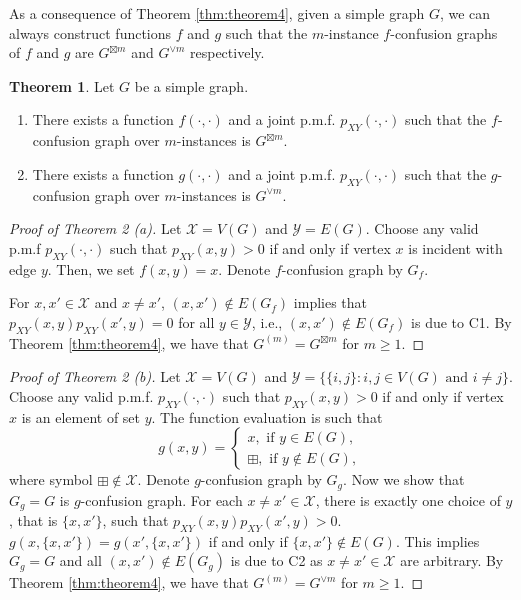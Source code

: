 \documentclass[journal, onecolumn, draftcls]{IEEEtran}
\theoremstyle{definition}
\newtheorem{theorem}{Theorem}
\newcommand{\calX}{\mathcal{X}}
\newcommand{\calY}{\mathcal{Y}}
\begin{document}
As a consequence of Theorem \ref{thm:theorem4}, given a simple graph $G$, we can always construct functions $f$ and $g$ such that the $m$-instance $f$-confusion graphs of $f$ and $g$ are  $G^{\boxtimes m}$ and $G^{\lor m}$ respectively. 
\begin{theorem}\label{thm:construct_function_based_on_G}
Let $G$ be a simple graph. 
\begin{enumerate}[label=(\alph*)]
\item There exists a function $f(\cdot,\cdot)$ and a joint p.m.f. $p_{XY}(\cdot,\cdot)$ such that  the   $f$-confusion graph over $m$-instances is $G^{\boxtimes m}$.
\item There exists a function $g(\cdot,\cdot)$ and a joint p.m.f. $p_{XY}(\cdot,\cdot)$ such that  the $g$-confusion graph over $m$-instances  is $G^{\lor m}$.
\end{enumerate}
\end{theorem}
\begin{proof}[Proof of Theorem 2 (a)]
Let $\calX = V(G)$ and $\calY = E(G)$. Choose any valid p.m.f $p_{XY}(\cdot,\cdot)$ such that  $p_{XY}(x,y)>0$ if and only if vertex $x$ is incident with edge $y$.  Then, we set $f(x,y) = x$. Denote $f$-confusion graph by $G_f$.


For $x, x' \in \calX$ and $x \neq x'$, $(x,x')\notin E(G_f)$ implies that $p_{XY}(x,y)p_{XY}(x',y)=0$ for all $y \in \calY$, i.e., $(x,x')\notin E(G_f)$ is due to C1.
By Theorem \ref{thm:theorem4}, we have that $G^{(m)} = G^{\boxtimes m}$ for $m\ge 1$.
\end{proof} 
\begin{proof} [Proof of Theorem 2 (b)]
Let $\calX = V(G)$ and $\calY=\{\{i,j\} : i,j\in V(G) \text{~and~} i\neq j\}$. Choose any valid p.m.f. $p_{XY}(\cdot,\cdot)$ such that  $p_{XY}(x,y)>0$ if and only if vertex $x$ is an element of set $y$.     The function evaluation is such that  $$ g(x,y) = \begin{cases}
    x,\text{ if }y\in E(G),\\
    \boxplus,\text{ if }y\notin E(G),
\end{cases}$$ 
where symbol $\boxplus \notin \calX$. Denote $g$-confusion graph by $G_g$. Now we show that $G_g=G$ is $g$-confusion graph. For each $x\ne x'\in \calX$, there is exactly one choice of $y$, that is $\{x,x'\}$, such that  $p_{XY}(x,y)p_{XY}(x',y)>0$. $g(x,\{x,x'\})= g(x',\{x,x'\})$ if and only if $\{x,x'\}\notin E(G)$. This implies $G_g= G$ and all $(x,x')\notin E(G_g)$ is due to C2 as $x\ne x'\in \calX$ are arbitrary.  By Theorem \ref{thm:theorem4}, we have that $G^{(m)} = G^{\lor m}$ for $m\ge 1$.
\end{proof}
\end{document}
